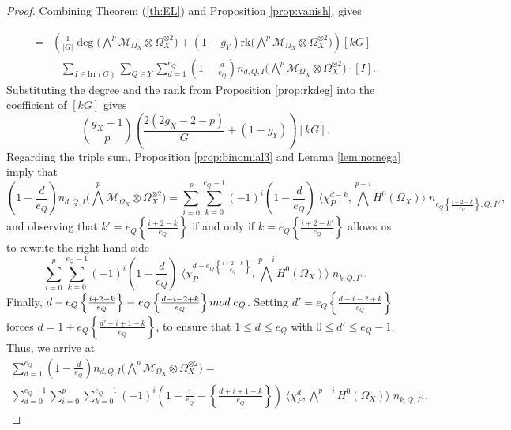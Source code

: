 \documentclass[10pt,a4paper]{amsart}
\begin{document}
\begin{proof}
Combining Theorem (\ref{th:EL}) and Proposition \ref{prop:vanish}, gives

\begin{align*}
[H^0\big(\bigwedge^p\mathcal{M}_{\Omega_X}\otimes\Omega_X^{\otimes 2}\big)]
=&
  \left( 
\frac{1}{|G|} \deg\big(\bigwedge^p\mathcal{M}_{\Omega_X}\otimes\Omega_X^{\otimes 2}\big)+(1-g_Y) \mathrm{rk}\big(\bigwedge^p\mathcal{M}_{\Omega_X}\otimes\Omega_X^{\otimes 2}\big)
  \right)[kG]\\
  &- 
  \sum_{I \in \mathrm{Irr}(G)} 
  \sum_{Q\in Y}
  \sum_{d=1}^{e_Q}
\left(
1 -\frac{d}{e_Q}
\right)
n_{d,Q,I}\big(\bigwedge^p\mathcal{M}_{\Omega_X}\otimes\Omega_X^{\otimes 2}\big) \cdot [I].
\end{align*}
Substituting the degree and the rank from Proposition \ref{prop:rkdeg} into the coefficient of $[kG]$ gives
\begin{equation}\label{eq:rkdeg}
\binom{g_X-1}{p} \left( 
\frac{2(2g_X-2-p)}{|G|} +(1-g_Y)
  \right)[kG].
\end{equation}
Regarding the triple sum, Proposition \ref{prop:binomial3} and Lemma \ref{lem:nomega} imply that
\[
\left(1-\frac{d}{e_Q}\right)n_{d,Q,I}\big(\bigwedge^p\mathcal{M}_{\Omega_X}\otimes \Omega_X^{\otimes 2}\big)
=
\sum_{i=0}^{p}\sum_{k=0}^{e_Q-1}
(-1)^i
\left(1-\frac{d}{e_Q}\right)
\;
\langle
\chi_P^{d-k},
\bigwedge^{p-i}H^0(\Omega_X)
\rangle
\;
n_{e_Q\left\{ \frac{i+2-k}{e_Q}\right\},Q,I^\vee},
\]
and observing that $k'=e_Q\left\{ \frac{i+2-k}{e_Q}\right\}$ if and only if $k=e_Q\left\{ \frac{i+2-k'}{e_Q}\right\}$ allows us to rewrite the right hand side
\[
\sum_{i=0}^{p}\sum_{k=0}^{e_Q-1}
(-1)^i
\left(1-\frac{d}{e_Q}\right)
\;
\langle
\chi_P^{d-e_Q\left\{ \frac{i+2-k}{e_Q}\right\}},
\bigwedge^{p-i}H^0(\Omega_X)
\rangle
\;
n_{k,Q,I^\vee}.
\]
Finally, $d-e_Q\left\{ \frac{i+2-k}{e_Q}\right\}\equiv e_Q\left\{ \frac{d-i-2+k}{e_Q}\right\}{\rm mod }\;e_Q$. Setting  $d'
=
e_Q
\left\{
\frac{d-i-2+k}{e_Q}
\right\}
$ forces
$
d=
1+
e_Q
\left\{
\frac{d'+i+1-k}{e_Q}
\right\}$,
to ensure that $1\leq d \leq e_Q$ with $0\leq d'\leq e_Q-1$.
Thus, we arrive at
\begin{multline*}
\sum_{d=1}^{e_Q}\left(1-\frac{d}{e_Q}\right)n_{d,Q,I}\big(\bigwedge^p\mathcal{M}_{\Omega_X}\otimes \Omega_X^{\otimes 2}\big)
=
\\
\sum_{d=0}^{e_Q-1}\sum_{i=0}^{p}\sum_{k=0}^{e_Q-1}
(-1)^i
\left(
1-\frac{1}{e_Q}-
\left\{
\frac{d+i+1-k}{e_Q}
\right\}
\right)
\;
\langle
\chi_P^{d},
\bigwedge^{p-i}H^0(\Omega_X)
\rangle
\;
n_{k,Q,I^\vee}.
\end{multline*}

\end{proof}
\end{document}
